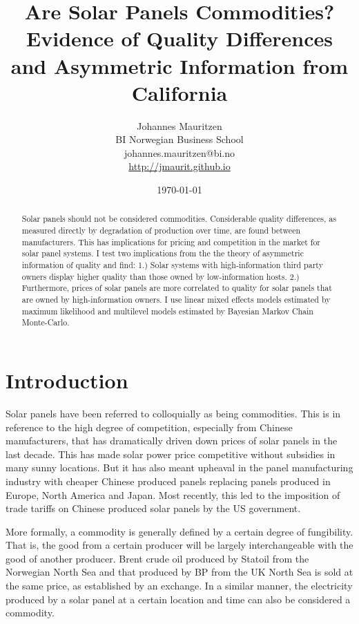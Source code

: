 \documentclass[12pt]{article}
\title{Are Solar Panels Commodities? Evidence of Quality Differences and Asymmetric Information from California}
\date{\today}
\author{Johannes Mauritzen \\ BI Norwegian Business School \\ johannes.mauritzen@bi.no\\\url{http://jmaurit.github.io}}
\begin{document}
 \begin{spacing}{1} %
	\maketitle

\begin{abstract}
 Solar panels should not be considered commodities. Considerable quality differences, as measured directly by degradation of production over time, are found between manufacturers. This has implications for pricing and competition in the market for solar panel systems. I test two implications from the the theory of asymmetric information of quality and find: 1.) Solar systems with high-information third party owners display higher quality than those owned by low-information hosts. 2.) Furthermore, prices of solar panels are more correlated to quality for solar panels that are owned by high-information owners. I use linear mixed effects models estimated by maximum likelihood and multilevel models estimated by Bayesian Markov Chain Monte-Carlo.
\end{abstract}

 \end{spacing}

\section{Introduction}

Solar panels have been referred to colloquially as being commodities. This is in reference to the high degree of competition, especially from Chinese manufacturers, that has dramatically driven down prices of solar panels in the last decade. This has made solar power price competitive without subsidies in many sunny locations. But it has also meant upheaval in the panel manufacturing industry with cheaper Chinese produced panels replacing panels produced in Europe, North America and Japan. Most recently, this led to the imposition of trade tariffs on Chinese produced solar panels by the US government.

More formally, a commodity is generally defined by a certain degree of fungibility. That is, the good from a certain producer will be largely interchangeable with the good of another producer. Brent crude oil produced by Statoil from the Norwegian North Sea and that produced by BP from the UK North Sea is sold at the same price, as established by an exchange. In a similar manner, the electricity produced by a solar panel at a certain location and time can also be considered a commodity.
\end{document}
